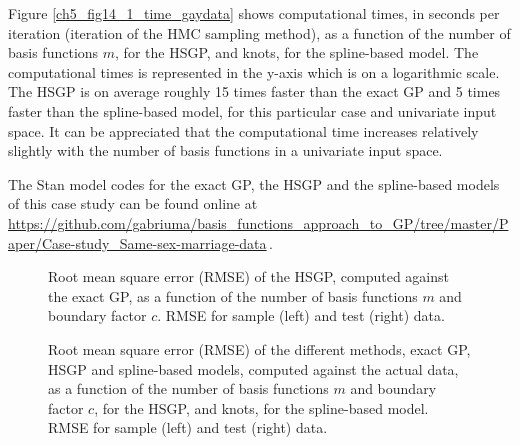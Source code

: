 \documentclass[onecolumn,a4paper,11pt]{article}
\begin{document}
Figure \ref{ch5_fig14_1_time_gaydata} shows computational times, in seconds per iteration (iteration of the HMC sampling method), as a function of the number of basis functions $m$, for the HSGP, and knots, for the spline-based model. The computational times is represented in the y-axis which is on a logarithmic scale. The HSGP is on average roughly 15 times faster than the exact GP and 5 times faster than the spline-based model, for this particular case and univariate input space. It can be appreciated that the computational time increases relatively slightly with the number of basis functions in a univariate input space.

The Stan model codes for the exact GP, the HSGP and the spline-based models of this case study can be found online at {\small \url{https://github.com/gabriuma/basis_functions_approach_to_GP/tree/master/Paper/Case-study_Same-sex-marriage-data}}\,.


\begin{figure}
\centering
{}
\caption{Root mean square error (RMSE) of the HSGP, computed against the exact GP, as a function of the number of basis functions $m$ and boundary factor $c$. RMSE for sample (left) and test (right) data.}
  \label{ch5_fig13_MSE_train_BF_gaydata}
\end{figure}

\begin{figure}
\centering
{}
\caption{Root mean square error (RMSE) of the different methods, exact GP, HSGP and spline-based models, computed against the actual data, as a function of the number of basis functions $m$ and boundary factor $c$, for the HSGP, and knots, for the spline-based model. RMSE for sample (left) and test (right) data.}
  \label{ch5_fig14_MSE_train_gaydata}
\end{figure}
\end{document}
